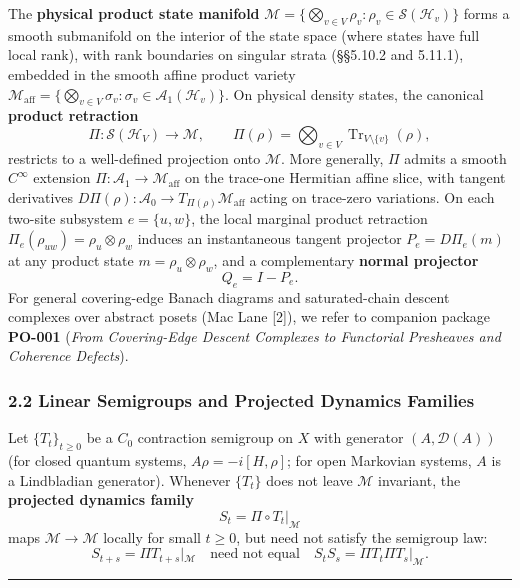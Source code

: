 \documentclass[
  11pt,
]{article}
\begin{document}
The \textbf{physical product state manifold} \(\mathcal{M} = \{\bigotimes_{v\in V}\rho_v : \rho_v \in \mathcal{S}(\mathcal{H}_v)\}\) forms a smooth submanifold on the interior of the state space (where states have full local rank), with rank boundaries on singular strata (§§5.10.2 and 5.11.1), embedded in the smooth affine product variety \(\mathcal{M}_{\mathrm{aff}} = \{\bigotimes_{v\in V}\sigma_v : \sigma_v \in \mathcal{A}_1(\mathcal{H}_v)\}\). On physical density states, the canonical \textbf{product retraction}
\[
\Pi: \mathcal{S}(\mathcal{H}_V) \longrightarrow \mathcal{M}, \qquad \Pi(\rho) = \bigotimes_{v\in V}\operatorname{Tr}_{V\setminus\{v\}}(\rho),
\]
restricts to a well-defined projection onto \(\mathcal{M}\). More generally, \(\Pi\) admits a smooth \(C^\infty\) extension \(\Pi: \mathcal{A}_1 \to \mathcal{M}_{\mathrm{aff}}\) on the trace-one Hermitian affine slice, with tangent derivatives \(D\Pi(\rho): \mathcal{A}_0 \to T_{\Pi(\rho)}\mathcal{M}_{\mathrm{aff}}\) acting on trace-zero variations. On each two-site subsystem \(e=\{u,w\}\), the local marginal product retraction \(\Pi_e(\rho_{uw}) = \rho_u \otimes \rho_w\) induces an instantaneous tangent projector \(P_e = D\Pi_e(m)\) at any product state \(m=\rho_u\otimes\rho_w\), and a complementary \textbf{normal projector}
\[
Q_e = I - P_e.
\]
For general covering-edge Banach diagrams and saturated-chain descent complexes over abstract posets (Mac Lane {[}2{]}), we refer to companion package \textbf{PO-001} (\emph{From Covering-Edge Descent Complexes to Functorial Presheaves and Coherence Defects}).

\subsubsection{2.2 Linear Semigroups and Projected Dynamics Families}\label{linear-semigroups-and-projected-dynamics-families}

Let \(\{T_t\}_{t \ge 0}\) be a \(C_0\) contraction semigroup on \(X\) with generator \((A, \mathcal{D}(A))\) (for closed quantum systems, \(A\rho = -i[H,\rho]\); for open Markovian systems, \(A\) is a Lindbladian generator). Whenever \(\{T_t\}\) does not leave \(\mathcal{M}\) invariant, the \textbf{projected dynamics family}
\[
S_t = \Pi \circ T_t\rvert_{\mathcal{M}}
\]
maps \(\mathcal{M} \to \mathcal{M}\) locally for small \(t\ge 0\), but need not satisfy the semigroup law:
\[
S_{t+s}=\Pi T_{t+s}|_{\mathcal{M}}
\quad\text{need not equal}\quad
S_tS_s=\Pi T_t\Pi T_s|_{\mathcal{M}}.
\]

\begin{center}\rule{0.5\linewidth}{0.5pt}\end{center}
\end{document}
